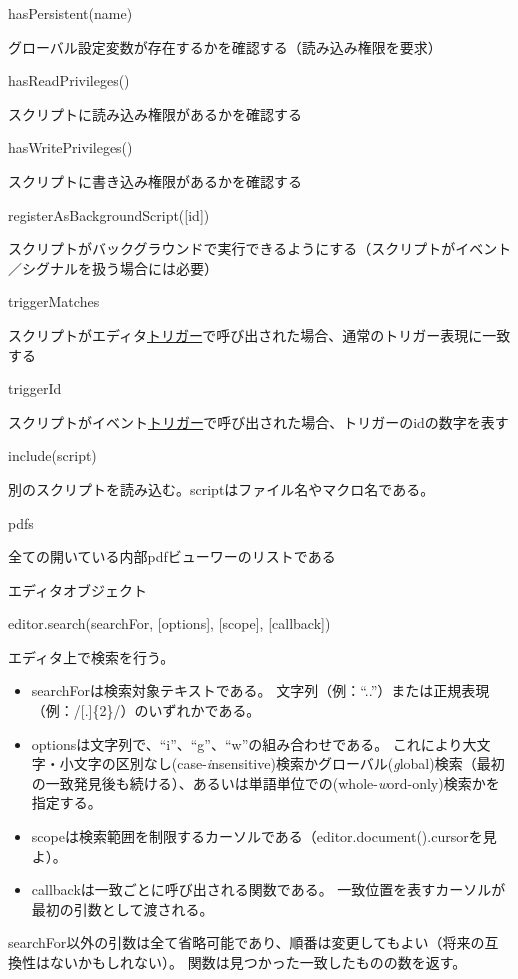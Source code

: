 \documentclass[]{book}
\begin{document}
hasPersistent(name)

グローバル設定変数が存在するかを確認する（読み込み権限を要求）

hasReadPrivileges()

スクリプトに読み込み権限があるかを確認する

hasWritePrivileges()

スクリプトに書き込み権限があるかを確認する

registerAsBackgroundScript({[}id{]})

スクリプトがバックグラウンドで実行できるようにする（スクリプトがイベント／シグナルを扱う場合には必要）

triggerMatches

スクリプトがエディタ\hyperref[sectionTriggers]{トリガー}で呼び出された場合、通常のトリガー表現に一致する

triggerId

スクリプトがイベント\hyperref[sectionTriggers]{トリガー}で呼び出された場合、トリガーのidの数字を表す

include(script)

別のスクリプトを読み込む。scriptはファイル名やマクロ名である。

pdfs

全ての開いている内部pdfビューワーのリストである

エディタオブジェクト

editor.search(searchFor, {[}options{]}, {[}scope{]}, {[}callback{]})

エディタ上で検索を行う。

\begin{itemize}
\item
  searchForは検索対象テキストである。
  文字列（例：``..''）または正規表現（例：/{[}.{]}\{2\}/）のいずれかである。
\item
  optionsは文字列で、``i''、``g''、``w''の組み合わせである。
  これにより大文字・小文字の区別なし(case-\emph{i}nsensitive)検索かグローバル(\emph{g}lobal)検索（最初の一致発見後も続ける）、あるいは単語単位での(whole-\emph{w}ord-only)検索かを指定する。
\item
  scopeは検索範囲を制限するカーソルである（editor.document().cursorを見よ）。
\item
  callbackは一致ごとに呼び出される関数である。
  一致位置を表すカーソルが最初の引数として渡される。
\end{itemize}

searchFor以外の引数は全て省略可能であり、順番は変更してもよい（将来の互換性はないかもしれない）。
関数は見つかった一致したものの数を返す。
\end{document}
